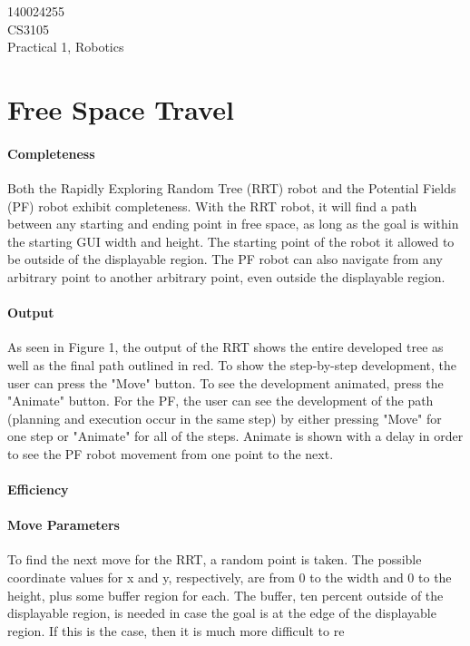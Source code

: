 \documentclass[12pt]{article}
\begin{document}
\begin{flushright}
140024255\\
CS3105\\
Practical 1, Robotics
\end{flushright}

\section{Free Space Travel}
\paragraph*{Completeness}
Both the Rapidly Exploring Random Tree (RRT) robot and the Potential Fields (PF) robot exhibit completeness. With the RRT robot, it will find a path between any starting and ending point in free space, as long as the goal is within the starting GUI width and height. The starting point of the robot it allowed to be outside of the displayable region. The PF robot can also navigate from any arbitrary point to another arbitrary point, even outside the displayable region.

\paragraph*{Output}
As seen in Figure 1, the output of the RRT shows the entire developed tree as well as the final path outlined in red. To show the step-by-step development, the user can press the "Move" button. To see the development animated, press the "Animate" button. For the PF, the user can see the development of the path (planning and execution occur in the same step) by either pressing "Move" for one step or "Animate" for all of the steps. Animate is shown with a delay in order to see the PF robot movement from one point to the next.
\paragraph*{Efficiency}

\paragraph*{Move Parameters}
To find the next move for the RRT, a random point is taken. The possible coordinate values for x and y, respectively, are from 0 to the width and 0 to the height, plus some buffer region for each. The buffer, ten percent outside of the displayable region, is needed in case the goal is at the edge of the displayable region. If this is the case, then it is much more difficult to re
\end{document}
